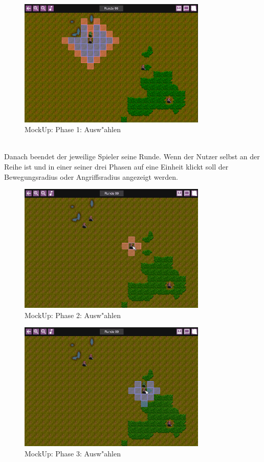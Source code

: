 \documentclass[12pt, titlepage]{scrartcl}
\begin{document}
			        \begin{figure}[H] 
    				    \centering
    				    \includegraphics[width=0.8\textwidth]{images/mockUps/Move2.png}
    				    \caption{MockUp: Phase 1: Ausw"ahlen}
    				    \label{Select_1}
			        \end{figure}
			        \ \\ Danach beendet der jeweilige Spieler seine Runde. Wenn der Nutzer selbst an der Reihe ist und in einer seiner drei Phasen auf eine Einheit klickt soll der Bewegungsradius oder Angriffsradius angezeigt werden. \\
                    \begin{figure}[H] 
    				    \centering
    				    \includegraphics[width=0.8\textwidth]{images/mockUps/ClickUnitAttackPhase.png}
    				    \caption{MockUp: Phase 2: Ausw"ahlen}
    				    \label{Select_2}
			        \end{figure} 
			        \begin{figure}[H] 
    				    \centering
    				    \includegraphics[width=0.8\textwidth]{images/mockUps/ClickUnitRestMovePhase.png}
    				    \caption{MockUp: Phase 3: Ausw"ahlen}
    				    \label{Select_3}
			        \end{figure} 
\end{document}
